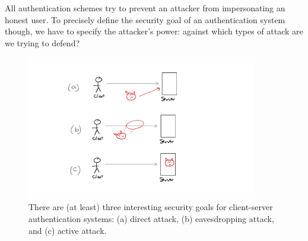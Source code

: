 All authentication schemes try 
to prevent an attacker from impersonating an honest user.
To precisely define the security goal of an authentication
system though, we have to specify the attacker's power:
against which types of attack are we trying to defend?
\begin{figure}
\includegraphics[width=0.9\textwidth]{figs/auth-attacks.pdf}
\caption{There are (at least) three interesting security 
  goals for client-server authentication systems:
  (a) direct attack, (b) eavesdropping attack, and (c) active attack.
}\label{fig:auth-attacks}
\end{figure}


